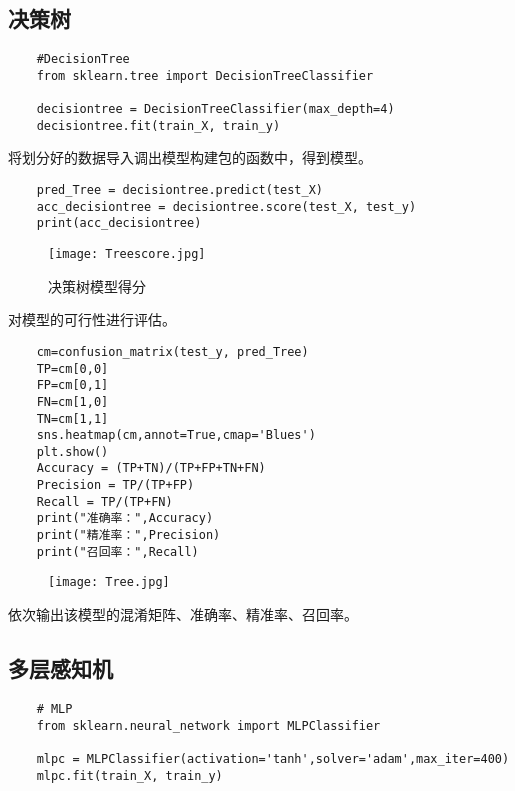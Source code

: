 \documentclass[AutoFakeBold]{LZUThesis}
\begin{document}
\subsection{决策树}
\begin{lstlisting}
    #DecisionTree
    from sklearn.tree import DecisionTreeClassifier
    
    decisiontree = DecisionTreeClassifier(max_depth=4)
    decisiontree.fit(train_X, train_y)
\end{lstlisting}
将划分好的数据导入调出模型构建包的函数中，得到模型。
\begin{lstlisting}
    pred_Tree = decisiontree.predict(test_X)
    acc_decisiontree = decisiontree.score(test_X, test_y)
    print(acc_decisiontree)
\end{lstlisting}
\begin{figure}[htbp]
    \centering
    \texttt{[image: Treescore.jpg]}
    \caption{决策树模型得分}
\end{figure}
对模型的可行性进行评估。
\begin{lstlisting}
    cm=confusion_matrix(test_y, pred_Tree)
    TP=cm[0,0]
    FP=cm[0,1]
    FN=cm[1,0]
    TN=cm[1,1]
    sns.heatmap(cm,annot=True,cmap='Blues')
    plt.show()
    Accuracy = (TP+TN)/(TP+FP+TN+FN)
    Precision = TP/(TP+FP)
    Recall = TP/(TP+FN)
    print("准确率：",Accuracy)
    print("精准率：",Precision)
    print("召回率：",Recall)
\end{lstlisting}
\begin{figure}[htbp]
    \centering
    \texttt{[image: Tree.jpg]}
\end{figure}
依次输出该模型的混淆矩阵、准确率、精准率、召回率。
\subsection{多层感知机}
\begin{lstlisting}
    # MLP
    from sklearn.neural_network import MLPClassifier
    
    mlpc = MLPClassifier(activation='tanh',solver='adam',max_iter=400)
    mlpc.fit(train_X, train_y)
\end{lstlisting}
\end{document}
